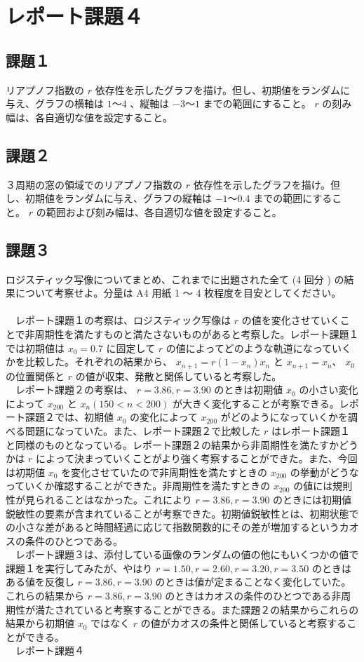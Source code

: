 \section{レポート課題４}
\subsection{課題１}
リアプノフ指数の $r$ 依存性を示したグラフを描け。但し、初期値をランダムに与え、グラフの横軸は $1 〜 4$ 、縦軸は $-3 〜 1$ までの範囲にすること。 $r$ の刻み幅は、各自適切な値を設定すること。\\


\subsection{課題２}
３周期の窓の領域でのリアプノフ指数の $r$ 依存性を示したグラフを描け。但し、初期値をランダムに与え、グラフの縦軸は $-1 〜 0.4$ までの範囲にすること。 $r$ の範囲および刻み幅は、各自適切な値を設定すること。


\subsection{課題３}
ロジスティック写像についてまとめ、これまでに出題された全て (4 回分 ) の結果について考察せよ。分量は A4 用紙 1 〜 4 枚程度を目安としてください。\\\\
　レポート課題１の考察は、ロジスティック写像は $r$ の値を変化させていくことで非周期性を満たすものと満たさないものがあると考察した。レポート課題１では初期値は $x_0 = 0.7$ に固定して $r$ の値によってどのような軌道になっていくかを比較した。それぞれの結果から、 $x_{n+1} = r(1 −x_n)x_n$ と $x_{n+1} = x_n$、 $x_0$ の位置関係と $r$ の値が収束、発散と関係していると考察した。\\
　レポート課題２の考察は、 $r = 3.86, r = 3.90$ のときは初期値 $x_0$ の小さい変化によって $x_{200}$ と $x_n (150 < n < 200)$ が大きく変化することが考察できる。レポート課題２では、初期値 $x_0$ の変化によって $x_{200}$ がどのようになっていくかを調べる問題になっていた。また、レポート課題２で比較した $r$ はレポート課題１と同様のものとなっている。レポート課題２の結果から非周期性を満たすかどうかは $r$ によって決まっていくことがより強く考察することができた。また、今回は初期値 $x_0$ を変化させていたので非周期性を満たすときの $x_{200}$ の挙動がどうなっていくか確認することができた。非周期性を満たすときの $x_{200}$ の値には規則性が見られることはなかった。これにより $r = 3.86, r = 3.90$ のときには初期値鋭敏性の要素が含まれていることが考察できた。初期値鋭敏性とは、初期状態での小さな差があると時間経過に応じて指数関数的にその差が増加するというカオスの条件のひとつである。\\
　レポート課題３は、添付している画像のランダムの値の他にもいくつかの値で課題１を実行してみたが、やはり $r = 1.50, r = 2.60, r = 3.20, r = 3.50$ のときはある値を反復し $r = 3.86, r = 3.90$ のときは値が定まることなく変化していた。これらの結果から $r = 3.86, r = 3.90$ のときはカオスの条件のひとつである非周期性が満たされていると考察することができる。また課題２の結果からこれらの結果から初期値 $x_0$ ではなく $r$ の値がカオスの条件と関係していると考察することができる。\\
　レポート課題４\\